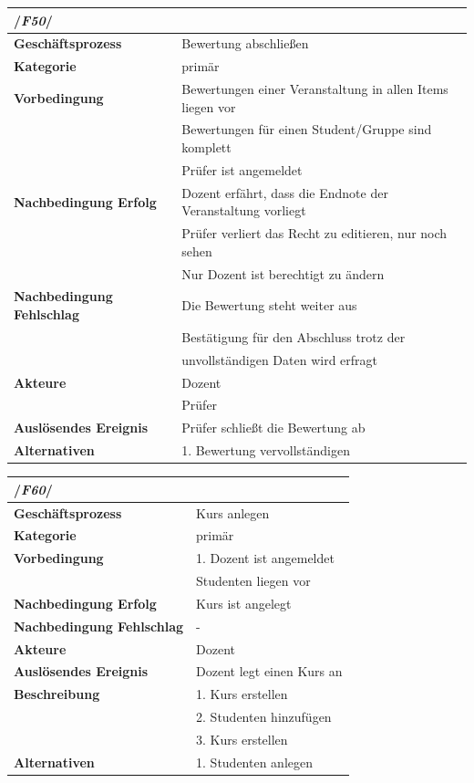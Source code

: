 \begin{table}[H]
	\begin{tabular}{ll}
		\multicolumn{2}{l}{/\textbf{\textit{F50}}/}\\\hline
		 \textbf{Geschäftsprozess} & Bewertung abschließen\\ 
		 \textbf{Kategorie} & primär \\ 
		 \textbf{Vorbedingung} & Bewertungen einer Veranstaltung in allen Items liegen vor\\
		 & Bewertungen für einen Student/Gruppe sind komplett\\
		 & Prüfer ist angemeldet \\ 
		 \textbf{Nachbedingung Erfolg} & Dozent erfährt, dass die Endnote der Veranstaltung vorliegt  \\ 
		 & Prüfer verliert das Recht zu editieren, nur noch sehen\\
		 & Nur Dozent ist berechtigt zu ändern\\
		 \textbf{Nachbedingung Fehlschlag} &  Die Bewertung steht weiter aus\\
		 & Bestätigung für den Abschluss trotz der \\
		 & unvollständigen Daten wird erfragt\\ 
		 \textbf{Akteure} & Dozent \\ 
		 & Prüfer\\
		 \textbf{Auslösendes Ereignis} & Prüfer schließt die Bewertung ab \\ 
		 \textbf{Alternativen} & 1. Bewertung vervollständigen \\
		 \end{tabular} 
	\label{tab:F50}
	\end{table}		
			
	\begin{table}[H]
		\begin{tabular}{ll}
			\multicolumn{2}{l}{/\textbf{\textit{F60}}/}\\\hline
			 \textbf{Geschäftsprozess} & Kurs anlegen\\ 
			 \textbf{Kategorie} & primär \\ 
			 \textbf{Vorbedingung} & 1. Dozent ist angemeldet \phantom{aaaaaaaaaaaaaaaaaaaaaaaaaaaaaaa} \\
			  & Studenten liegen vor\\
			 \textbf{Nachbedingung Erfolg} & Kurs ist angelegt\\
			 \textbf{Nachbedingung Fehlschlag} & -\\
			 \textbf{Akteure} & Dozent \\ 
			 \textbf{Auslösendes Ereignis} & Dozent legt einen Kurs an\\ 
			 \textbf{Beschreibung} &  1. Kurs erstellen\\
			 & 2. Studenten hinzufügen\\
			 & 3. Kurs erstellen\\
			 \textbf{Alternativen} & 1. Studenten anlegen \\
			 \end{tabular} 
		\label{tab:F60}
		\end{table}
		
